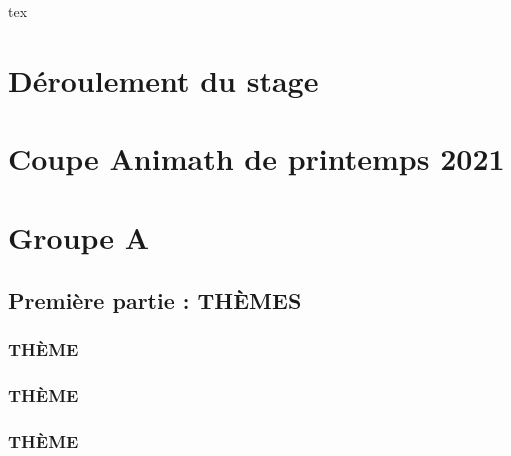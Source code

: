 \documentclass[poly,trombi]{valbonne}
\begin{document}
tex


\pagestyle{plain}

\footnotesize
\pagestyle{trombi}
\newpage


\normalsize


\pagestyle{empty}

\renewcommand{\headrulewidth}{0.4pt}

\tableofcontents

\chapter{Déroulement du stage}
\pagestyle {plain}



\chapter{Coupe Animath de printemps 2021}


\chapter{Groupe A}

\minitoc \clearpage

\section{Première partie : THÈMES}

\subsection{THÈME}


\subsection{THÈME}


\subsection{THÈME}
\end{document}
